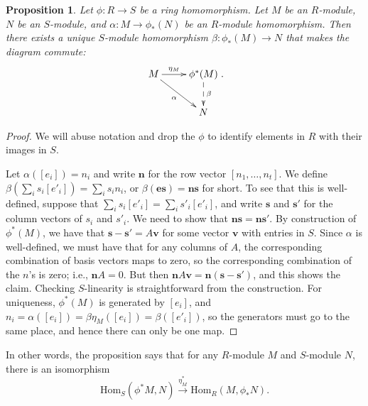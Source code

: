 \documentclass{amsart}[12pt]
\newcommand{\Hom}{\mathrm{Hom}}
\newcommand{\bs}[1]{\mathbf{#1}}
\numberwithin{equation}{section}
\theoremstyle{plain} %
\newtheorem{prop}[equation]{Proposition}
\theoremstyle{definition}
\theoremstyle{remark}
\newcommand{\xra}[1]{\xrightarrow{#1}}
\begin{document}
\begin{prop}
Let $\phi:R\to S$ be a ring homomorphism. Let $M$ be an $R$-module, $N$ be an $S$-module, and $\alpha:M \to \phi_*(N)$ be an $R$-module homomorphism. Then there exists a unique $S$-module homomorphism $\beta: \phi_*(M) \to N$ that makes the diagram commute:
\[ \xymatrix{  M \ar[r]^-{\eta_M} \ar[dr]_-{\alpha} & \phi^*(M) \ar@{-->}[d]^-{\beta} \\ & N}.\]
\end{prop}
\begin{proof} We will abuse notation and drop the $\phi$ to identify elements in $R$ with their images in $S$.

Let $\alpha([e_i]) = n_i$ and write $\bs{n}$ for the row vector $[n_1,\dots,n_t]$. We define $\beta( \sum_i s_i [e'_i] ) = \sum_i s_i n_i$, or $\beta(\mathbf{e}\mathbf{s}) = \mathbf{n}\mathbf{s}$ for short. To see that this is well-defined, suppose that $\sum_i s_i [e'_i] = \sum_i s'_i [e'_i]$, and write $\bs{s}$ and $\bs{s'}$ for the column vectors of $s_i$ and $s'_i$. We need to show that $\bs{n}\bs{s}=\bs{n}\bs{s'}$. By construction of $\phi^*(M)$, we have that $\bs{s}-\bs{s'} = A \bs{v}$ for some vector $\bs{v}$ with entries in $S$. Since $\alpha$ is well-defined, we must have that for any columns of $A$, the corresponding combination of basis vectors maps to zero, so the corresponding combination of the $n$'s is zero; i.e., $\bs{n} A=0$. But then $\bs{n} A \bs{v} = \bs{n} (\bs{s}-\bs{s'})$, and this shows the claim. Checking $S$-linearity is straightforward from the construction.
 For uniqueness, $\phi^*(M)$ is generated by $[e_i]$, and $n_i = \alpha([e_i])= \beta \eta_M([e_i])=\beta([e'_i])$, so the generators must go to the same place, and hence there can only be one map.
\end{proof}

In other words, the proposition says that for any $R$-module $M$ and $S$-module $N$, there is an isomorphism 
\[  \Hom_S(\phi^*M,N) \xra{\eta_M^*} \Hom_R(M,\phi_* N).\]
\end{document}
